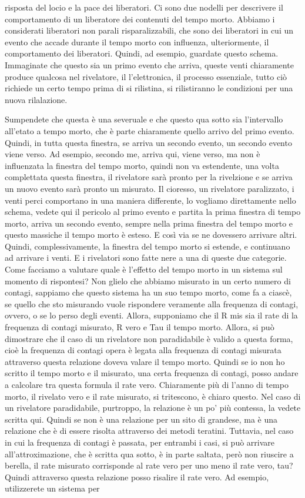 risposta del locio e la pace dei liberatori. Ci sono due nodelli per descrivere il comportamento di un liberatore dei contenuti del tempo morto. Abbiamo i considerati liberatori non parali risparalizzabili, che sono dei liberatori in cui un evento che accade durante il tempo morto con influenza, ulteriormente, il comportamento dei liberatori. Quindi, ad esempio, guardate questo schema. Immaginate che questo sia un primo evento che arriva, queste venti chiaramente produce qualcosa nel rivelatore, il l'elettronica, il processo essenziale, tutto ciò richiede un certo tempo prima di si rilistina, si rilistiranno le condizioni per una nuova rilalazione. 

Sumpendete che questa è una severuale e che questo qua sotto sia l'intervallo all'etato a tempo morto, che è parte chiaramente quello arrivo del primo evento. Quindi, in tutta questa finestra, se arriva un secondo evento, un secondo evento viene verso. Ad esempio, secondo me, arriva qui, viene verso, ma non è influenzata la finestra del tempo morto, quindi non va estendente, una volta complettata questa finestra, il rivelatore sarà pronto per la rivelzione e se arriva un nuovo evento sarà pronto un misurato. Il cioresso, un rivelatore paralizzato, i venti perci comportano in una maniera differente, lo vogliamo direttamente nello schema, vedete qui il pericolo al primo evento e partita la prima finestra di tempo morto, arriva un secondo evento, sempre nella prima finestra del tempo morto e questo massiche il tempo morto è esteso. E così via se ne dovessero arrivare altri. Quindi, complessivamente, la finestra del tempo morto si estende, e continuano ad arrivare i venti. E i rivelatori sono fatte nere a una di queste due categorie. Come facciamo a valutare quale è l'effetto del tempo morto in un sistema sul momento di rispontesi? Non glielo che abbiamo misurato in un certo numero di contagi, sappiamo che questo sistema ha un suo tempo morto, come fa a ciascè, se quello che sto misurando vuole rispondere veramente alla frequenza di contagi, ovvero, o se lo perso degli eventi. Allora, supponiamo che il R mis sia il rate di la frequenza di contagi misurato, R vero e Tau il tempo morto. Allora, si può dimostrare che il caso di un rivelatore non paradidabile è valido a questa forma, cioè la frequenza di contagi opera è legata alla frequenza di contagi misurata attraverso questa relazione doveva valare il tempo morto. Quindi se io non ho scritto il tempo morto e il misurato, una certa frequenza di contagi, posso andare a calcolare tra questa formula il rate vero. Chiaramente più di l'anno di tempo morto, il rivelato vero e il rate misurato, si tritescono, è chiaro questo. Nel caso di un rivelatore paradidabile, purtroppo, la relazione è un po' più contessa, la vedete scritta qui. Quindi se non è una relazione per un sito di grandese, ma è una relazione che è di essere risolta attraverso dei metodi teratini. Tuttavia, nel caso in cui la frequenza di contagi è passata, per entrambi i casi, si può arrivare all'attroximazione, che è scritta qua sotto, è in parte saltata, però non riuscire a berella, il rate misurato corrisponde al rate vero per uno meno il rate vero, tau? Quindi attraverso questa relazione posso risalire il rate vero. Ad esempio, utilizzerete un sistema per 